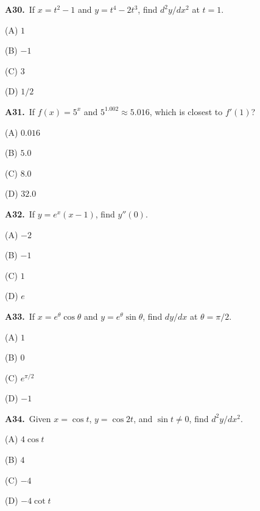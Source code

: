 \documentclass[11pt]{article}
\begin{document}
\bigskip\noindent\textbf{A30.}\ If $x=t^2-1$ and $y=t^4-2t^3$, find $d^2y/dx^2$ at $t=1$.
\begin{list}{}{\setlength{\leftmargin}{3em}\setlength{\labelwidth}{2.5em}\setlength{\itemsep}{0pt}\setlength{\topsep}{2pt}}
\item[(A)] $1$
\item[(B)] $-1$
\item[(C)] $3$
\item[(D)] $1/2$
\end{list}

\bigskip\noindent\textbf{A31.}\ If $f(x)=5^x$ and $5^{1.002}\approx5.016$, which is closest to $f'(1)$?
\begin{list}{}{\setlength{\leftmargin}{3em}\setlength{\labelwidth}{2.5em}\setlength{\itemsep}{0pt}\setlength{\topsep}{2pt}}
\item[(A)] $0.016$
\item[(B)] $5.0$
\item[(C)] $8.0$
\item[(D)] $32.0$
\end{list}

\bigskip\noindent\textbf{A32.}\ If $y=e^x(x-1)$, find $y''(0)$.
\begin{list}{}{\setlength{\leftmargin}{3em}\setlength{\labelwidth}{2.5em}\setlength{\itemsep}{0pt}\setlength{\topsep}{2pt}}
\item[(A)] $-2$
\item[(B)] $-1$
\item[(C)] $1$
\item[(D)] $e$
\end{list}

\bigskip\noindent\textbf{A33.}\ If $x=e^\theta\cos\theta$ and $y=e^\theta\sin\theta$, find $dy/dx$ at $\theta=\pi/2$.
\begin{list}{}{\setlength{\leftmargin}{3em}\setlength{\labelwidth}{2.5em}\setlength{\itemsep}{0pt}\setlength{\topsep}{2pt}}
\item[(A)] $1$
\item[(B)] $0$
\item[(C)] $e^{\pi/2}$
\item[(D)] $-1$
\end{list}

\bigskip\noindent\textbf{A34.}\ Given $x=\cos t$, $y=\cos2t$, and $\sin t\ne0$, find $d^2y/dx^2$.
\begin{list}{}{\setlength{\leftmargin}{3em}\setlength{\labelwidth}{2.5em}\setlength{\itemsep}{0pt}\setlength{\topsep}{2pt}}
\item[(A)] $4\cos t$
\item[(B)] $4$
\item[(C)] $-4$
\item[(D)] $-4\cot t$
\end{list}
\end{document}
